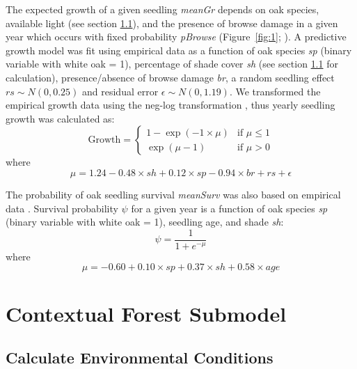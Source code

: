 \documentclass[
11pt, %
a4paper, %
oneside, %
headinclude,footinclude, %
]{scrartcl}
\begin{document}
The expected growth of a given seedling \textit{meanGr} depends on oak species, available light (see section \ref{environmental}), and the presence of browse damage in a given year which occurs with fixed probability \textit{pBrowse} (Figure~\ref{fig:1}; \citep{Kellner2017}). A predictive growth model was fit using empirical data \citep{Kellner2016b} as a function of oak species \textit{sp} (binary variable with white oak = 1), percentage of shade cover \textit{sh} (see section \ref{environmental} for calculation), presence/absence of browse damage \textit{br}, a random seedling effect $rs \sim N(0, 0.25)$ and residual error $\epsilon \sim N(0, 1.19)$. We transformed the empirical growth data using the neg-log transformation \citep{Whittaker2005}, thus yearly seedling growth was calculated as:
\begin{equation}
\text{Growth} = 
\begin{cases} 
1 - \exp{(-1 \times \mu)} & \text{if } \mu \leq 1 \\
\exp{(\mu - 1)}       & \text{if } \mu > 0
\end{cases}
\end{equation}
where
\begin{equation}
\mu = 1.24 - 0.48 \times sh + 0.12 \times sp - 0.94 \times br + rs + \epsilon
\end{equation}

The probability of oak seedling survival \textit{meanSurv} was also based on empirical data \citep{Kellner2016b}. Survival probability $\psi$ for a given year is a function of oak species \textit{sp} (binary variable with white oak = 1), seedling age, and shade \textit{sh}:
\begin{equation}
\psi = \frac{1}{1 + e^{-\mu}}
\end{equation}
where
\begin{equation}
\mu = -0.60 + 0.10 \times sp + 0.37 \times sh + 0.58 \times age
\end{equation}

\section{Contextual Forest Submodel}
\label{contextual}

\subsection{Calculate Environmental Conditions}
\label{environmental}
\end{document}
